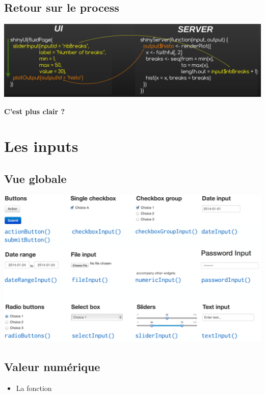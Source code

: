 \documentclass[
]{article}
\providecommand{\tightlist}{%
  \setlength{\itemsep}{0pt}\setlength{\parskip}{0pt}}
\begin{document}
\hypertarget{retour-sur-le-process}{%
\subsection{Retour sur le process}\label{retour-sur-le-process}}

\includegraphics{img/shiny_process.png}

\textbf{C'est plus clair ?}

\hypertarget{les-inputs}{%
\section{Les inputs}\label{les-inputs}}

\hypertarget{vue-globale}{%
\subsection{Vue globale}\label{vue-globale}}

\includegraphics{img/all_input.png}

\hypertarget{valeur-numuxe9rique}{%
\subsection{Valeur numérique}\label{valeur-numuxe9rique}}

\begin{itemize}
\tightlist
\item
  La fonction
\end{itemize}
\end{document}
